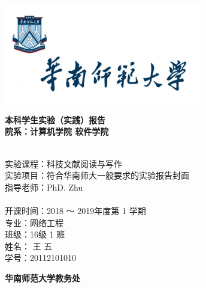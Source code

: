 \documentclass[10.5pt,a4paper,headings]{ctexart}
\newcommand{\titleline}[1]{\hspace*{6em} #1 \\}
\begin{document}
\begin{titlepage}
\scshape


\begin{center}
\vspace*{0.6cm}
\includegraphics[width=0.65\textwidth]{./logo.jpg}

\doublespacing
\fontsize{18pt}{2em}\bf
本科学生实验（实践）报告\\
\vspace{1em}
院系：计算机学院
\hspace{2ex}
软件学院
\end{center}

\begin{flushleft}

\setlength{\parindent}{2em}
\bf
{\fontsize{14pt}{18pt}

\linespread{1.5}\selectfont
~\\
\titleline{实验课程：科技文献阅读与写作}

\titleline{实验项目：符合华南师大一般要求的实验报告封面}

\titleline{指导老师：PhD. Zhu}
~\\
\titleline{开课时间：2018 ～ 2019年度第 1 学期}

\titleline{专\hspace{2em}业：网络工程}

\titleline{班\hspace{2em}级：16级 1 班}

\titleline{姓\hspace{2em}名： 王 五}

\titleline{学\hspace{2em}号：20112101010}
}
\end{flushleft}

\begin{center}
\vspace{3cm}
\fontsize{14pt}{21pt}
\bf 华南师范大学教务处
\end{center}

\end{titlepage}
\end{document}
